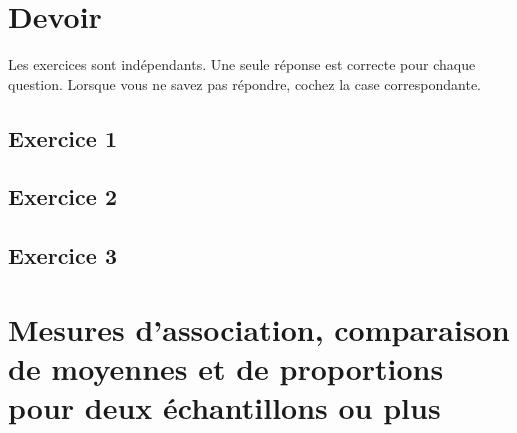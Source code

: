 \chapter*{Devoir }

Les exercices sont indépendants. Une seule réponse est correcte pour chaque
question. Lorsque vous ne savez pas répondre, cochez la case correspondante.

\section*{Exercice 1}
\section*{Exercice 2}
\section*{Exercice 3}\label{dev7:exo3}

\chapter[Mesures d'association, comparaison de moyennes et de
proportions]{Mesures d'association, comparaison de moyennes et de
  proportions pour deux échantillons ou plus}   

